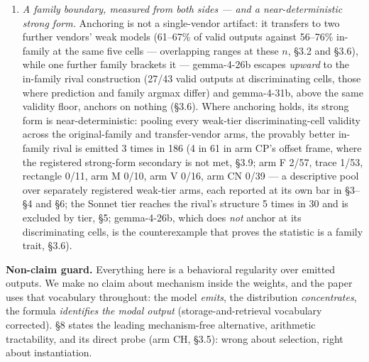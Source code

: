 \begin{enumerate}
checkable against emitted coordinates, and 54 of 56 scoreable claims (96.4\%) describe the object
actually built (Wilson 95\% interval $[88\%, 99\%]$, \S6.5). Requesting the line at all is an
intervention rather than an observation: the concentration shift it produced (87\% vs 70\%,
$p = 0.0325$ uncorrected) fails multiplicity correction, is carried by one of three cells and is
wave-confounded (\S6.4), so it is reported as met-as-registered exploratory material, not a
demonstrated effect. Studies collecting process descriptors \emph{by request} are nonetheless
measuring a perturbed distribution.
\item \emph{A family boundary, measured from both sides --- and a near-deterministic strong form.}
Anchoring is not a single-vendor artifact: it transfers to two further vendors' weak models
(61--67\% of valid outputs against 56--76\% in-family at the same five cells --- overlapping
ranges at these $n$, \S3.2 and \S3.6), while one further family brackets it --- gemma-4-26b escapes \emph{upward} to the
in-family rival construction (27/43 valid outputs at discriminating cells, those where prediction
and family argmax differ) and gemma-4-31b, above the same validity floor, anchors on nothing
(\S3.6). Where anchoring holds, its strong form is near-deterministic: pooling every weak-tier
discriminating-cell validity across the original-family and transfer-vendor arms, the provably
better in-family rival is emitted 3 times in 186 (4 in 61 in arm CP's offset frame, where the
registered strong-form secondary is not met, \S3.9; arm F 2/57, trace 1/53, rectangle 0/11, arm M
0/10, arm V 0/16, arm CN 0/39 --- a descriptive pool over separately registered weak-tier arms,
each reported at its own bar in \S3--\S4 and \S6; the Sonnet tier reaches the rival's structure 5
times in 30 and is excluded by tier, \S5; gemma-4-26b, which does \emph{not} anchor at its
discriminating cells, is the counterexample that proves the statistic is a family trait, \S3.6).
\end{enumerate}

\textbf{Non-claim guard.} Everything here is a behavioral regularity over emitted outputs. We make
no claim about mechanism inside the weights, and the paper uses that vocabulary throughout: the
model \emph{emits}, the distribution \emph{concentrates}, the formula \emph{identifies the modal
output} (storage-and-retrieval vocabulary corrected). \S8 states the leading mechanism-free alternative, arithmetic tractability, and its direct
probe (arm CH, \S3.5): wrong about selection, right about instantiation.

